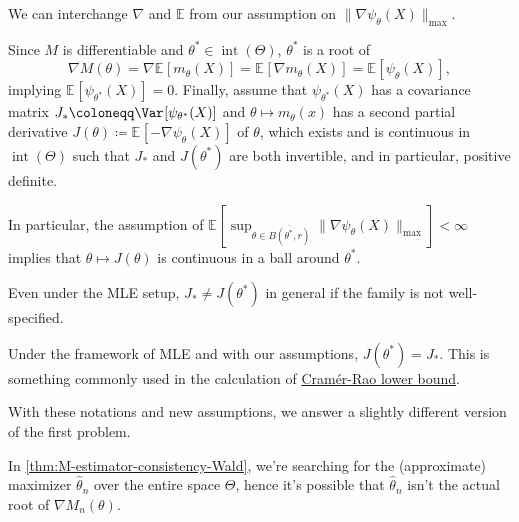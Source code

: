 \begin{note}
	We can interchange \(\nabla \) and \(\mathbb{E} \) from our assumption on \(\lVert \nabla \psi _\theta (X) \rVert _{\max }\).
\end{note}

Since \(M\) is differentiable and \(\theta ^{\ast} \in \operatorname{int}(\Theta ) \), \(\theta ^{\ast} \) is a root of
\[
	\nabla M(\theta )
	= \nabla \mathbb{E}_{}[m_\theta (X)]
	= \mathbb{E}_{}[\nabla m_\theta (X)]
	= \mathbb{E}_{}[\psi _\theta (X)],
\]
implying \(\mathbb{E}_{}[\psi _{\theta ^{\ast} }(X)] = 0\). Finally, assume that \(\psi _{\theta ^{\ast} }(X)\) has a covariance matrix \(J_{\ast} \coloneqq \Var_{}[\psi _{\theta ^{\ast} }(X)]\) and \(\theta \mapsto m_\theta (x)\) has a second partial derivative \(J(\theta ) \coloneqq \mathbb{E}_{}[-\nabla \psi _\theta (X)]\) of \(\theta \), which exists and is continuous in \(\operatorname{int}(\Theta ) \) such that \(J_{\ast} \) and \(J(\theta ^{\ast} )\) are both invertible, and in particular, positive definite.

\begin{remark}
	In particular, the assumption of \(\mathbb{E}_{}[\sup _{\theta \in \overline{B(\theta ^{\ast} , r )} } \lVert \nabla \psi _\theta (X) \rVert _{\max }] < \infty \) implies that \(\theta \mapsto J(\theta )\) is continuous in a ball around \(\theta ^{\ast} \).
\end{remark}

\begin{note}
	Even under the MLE setup, \(J_{\ast} \neq J(\theta ^{\ast} )\) in general if the family is not well-specified.
\end{note}

\begin{eg}
	Under the framework of MLE and with our assumptions, \(J(\theta ^{\ast} ) = J_{\ast}\). This is something commonly used in the calculation of \href{https://en.wikipedia.org/wiki/Cram%C3%A9r%E2%80%93Rao_bound}{Cramér-Rao lower bound}.
\end{eg}

With these notations and new assumptions, we answer a slightly different version of the first problem.

\begin{prev}
	In \autoref{thm:M-estimator-consistency-Wald}, we're searching for the (approximate) maximizer \(\hat{\theta} _n\) over the entire space \(\Theta \), hence it's possible that \(\hat{\theta} _n\) isn't the actual root of \(\nabla M_n(\theta )\).
\end{prev}

